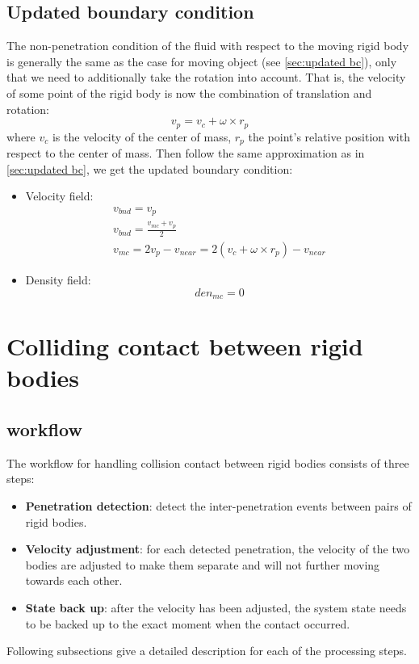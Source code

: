 \subsection{Updated boundary condition}
The non-penetration condition of the fluid with respect to the moving rigid body is generally the same as the case for moving object (see \autoref{sec:updated bc}), only that we need to additionally take the rotation into account. That is, the velocity of some point of the rigid body is now the combination of translation and rotation:
\begin{equation*}
    v_p=v_c+\omega \times r_p
\end{equation*}
where $v_c$ is the velocity of the center of mass, $r_p$ the point's relative position with respect to the center of mass.
Then follow the same approximation as in \autoref{sec:updated bc}, we get the updated boundary condition:
\begin{itemize}
    \item Velocity field:
    \begin{gather*}
        v_{bnd}=v_p\\
        v_{bnd}=\frac{v_{mc}+v_{p}}{2}\\
        v_{mc}=2v_{p}-v_{near}=2(v_c+\omega \times r_p)-v_{near}
    \end{gather*}
    \item Density field:
    \begin{equation*}
        den_{mc}=0
    \end{equation*}
\end{itemize}
\section{Colliding contact between rigid bodies}
\subsection{workflow}
The workflow for handling collision contact between rigid bodies consists of three steps:
\begin{itemize}
    \item \textbf{Penetration detection}: detect the inter-penetration events between pairs of rigid bodies.
    \item \textbf{Velocity adjustment}: for each detected penetration, the velocity of the two bodies are adjusted to make them separate and will not further moving towards each other.
    \item \textbf{State back up}: after the velocity has been adjusted, the system state needs to be backed up to the exact moment when the contact occurred.
\end{itemize}
Following subsections give a detailed description for each of the processing steps.
